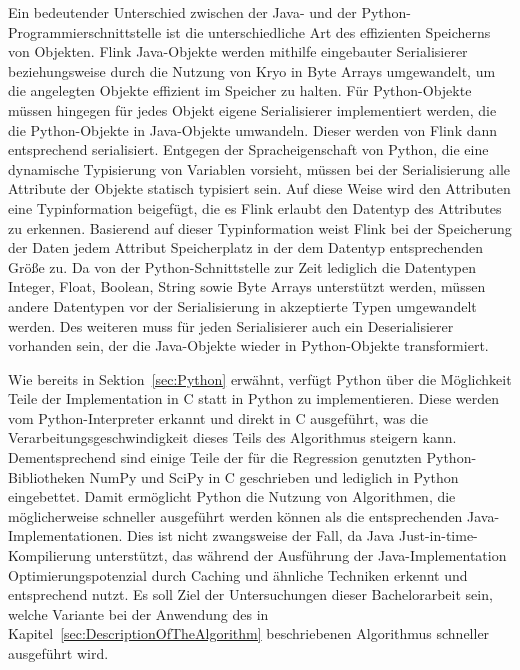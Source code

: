 Ein bedeutender Unterschied zwischen der Java- und der Python-Programmierschnittstelle ist die unterschiedliche Art des effizienten Speicherns von Objekten. Flink Java-Objekte werden mithilfe eingebauter Serialisierer beziehungsweise durch die Nutzung von Kryo in Byte Arrays umgewandelt, um die angelegten Objekte effizient im Speicher zu halten. Für Python-Objekte müssen hingegen für jedes Objekt eigene Serialisierer implementiert werden, die die Python-Objekte in Java-Objekte umwandeln. Dieser werden von Flink dann entsprechend serialisiert. Entgegen der Spracheigenschaft von Python, die eine dynamische Typisierung von Variablen vorsieht, müssen bei der Serialisierung alle Attribute der Objekte statisch typisiert sein. Auf diese Weise wird den Attributen eine Typinformation beigefügt, die es Flink erlaubt den Datentyp des Attributes zu erkennen. Basierend auf dieser Typinformation weist Flink bei der Speicherung der Daten jedem Attribut Speicherplatz in der dem Datentyp entsprechenden Größe zu. Da von der Python-Schnittstelle zur Zeit lediglich die Datentypen Integer, Float, Boolean, String sowie Byte Arrays unterstützt werden, müssen andere Datentypen vor der Serialisierung in akzeptierte Typen umgewandelt werden. Des weiteren muss für jeden Serialisierer auch ein Deserialisierer vorhanden sein, der die Java-Objekte wieder in Python-Objekte transformiert.

Wie bereits in Sektion~\ref{sec:Python} erwähnt, verfügt Python über die Möglichkeit Teile der Implementation in C statt in Python zu implementieren. Diese werden vom Python-Interpreter erkannt und direkt in C ausgeführt, was die Verarbeitungsgeschwindigkeit dieses Teils des Algorithmus steigern kann. Dementsprechend sind einige Teile der für die Regression genutzten Python-Bibliotheken NumPy und SciPy in C geschrieben und lediglich in Python eingebettet. Damit ermöglicht Python die Nutzung von Algorithmen, die möglicherweise schneller ausgeführt werden können als die entsprechenden Java-Implementationen. Dies ist nicht zwangsweise der Fall, da Java Just-in-time- Kompilierung unterstützt, das während der Ausführung der Java-Implementation Optimierungspotenzial durch Caching und ähnliche Techniken erkennt und entsprechend nutzt. Es soll Ziel der Untersuchungen dieser Bachelorarbeit sein, welche Variante bei der Anwendung des in Kapitel~\ref{sec:DescriptionOfTheAlgorithm} beschriebenen Algorithmus schneller ausgeführt wird.

